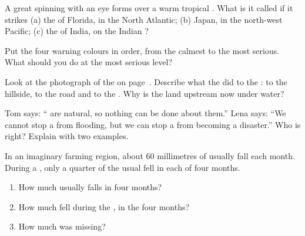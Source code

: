 \begin{exercise}[$\star$]\label{exo:g5:natural-hazards:5}
A great spinning  with an eye forms over a warm tropical . What is
it called if it strikes (a) the  of Florida, in the North Atlantic;
(b) Japan, in the north-west Pacific; (c) the  of India, on the Indian
?
\end{exercise}

\begin{exercise}[$\star$]\label{exo:g5:natural-hazards:6}
Put the four warning colours in order, from the calmest to the most
serious. What should you do at the most serious level?
\end{exercise}

\begin{exercise}[$\star\star$]\label{exo:g5:natural-hazards:7}
Look at the photograph of the  on
page~\pageref{fig:g5:natural-hazards:landslide}. Describe what the
 did to the : to the hillside, to the road and to the .
Why is the land upstream now under water?
\end{exercise}

\begin{exercise}[$\star\star$]\label{exo:g5:natural-hazards:8}
Tom says: `` are natural, so nothing can be done about them.'' Lena
says: ``We cannot stop a  from flooding, but we can stop a  from
becoming a disaster.'' Who is right? Explain with two examples.
\end{exercise}

\begin{exercise}[$\star\star$]\label{exo:g5:natural-hazards:9}
In an imaginary farming region, about 60 millimetres of  usually fall
each month. During a , only a quarter of the usual  fell in each
of four months.
\begin{enumerate}
  \item[(a)] How much  usually falls in four months?
  \item[(b)] How much fell during the , in the four months?
  \item[(c)] How much  was missing?
\end{enumerate}
\end{exercise}

